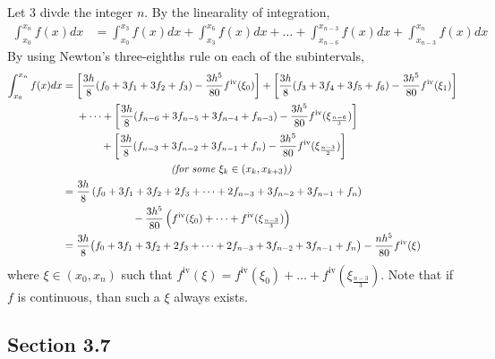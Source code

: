 \documentclass[12pt]{article}
\begin{document}
\noindent Let $3$ divde the integer $n$.  By the linearality of integration,
\begin{align*}
	\int_{x_0}^{x_n} f(x) dx &= \int_{x_0}^{x_3} f(x) dx + \int_{x_3}^{x_6} f(x) dx + \dots + \int_{x_{n-6}}^{x_{n-3}} f(x) dx + \int_{x_{n-3}}^{x_n} f(x) dx
\end{align*}
By using Newton's three-eighths rule on each of the subintervals,
\begin{align*}
	\int_{x_0}^{x_n} f(x) dx &= \left[\frac{3h}{8} (f_0 + 3f_1 + 3f_2 + f_3) - \frac{3h^5}{80}f^{\text{iv}}(\xi_0)\right] + \left[\frac{3h}{8} (f_3 + 3f_4 + 3f_5 + f_6) - \frac{3h^5}{80}f^{\text{iv}}(\xi_1)\right] \\
	&\ \ \ \ + \dots + \left[\frac{3h}{8} (f_{n-6} + 3f_{n-5} + 3f_{n-4} + f_{n-3}) - \frac{3h^5}{80}f^{\text{iv}}(\xi_{\frac{n-6}{3}})\right] \\
	&\ \ \ \ \ \ \ \ \ \ \ + \left[\frac{3h}{8} (f_{n-3} + 3f_{n-2} + 3f_{n-1} + f_n) - \frac{3h^5}{80}f^{\text{iv}}(\xi_{\frac{n-3}{2}})\right] \\
	&\ \ \ \ \ \ \ \ \ \ \ \ \ \ \ \ \ \ \ \ \ \ \ \ \ \ \ \ \ \ \ \text{\it (for some $\xi_k \in (x_k, x_{k+3})$)} \\
	&= \frac{3h}{8}\left(f_0 + 3f_1 + 3f_2 + 2f_3 + \dots + 2f_{n-3} + 3f_{n-2} + 3f_{n-1} + f_n\right) \\
	&\ \ \ \ \ \ \ \ \ \ \ \ \ \ \ \ \ \ \ \ - \frac{3h^5}{80}\left(f^{\text{iv}}(\xi_0) + \dots + f^{\text{iv}}(\xi_{\frac{n-3}{3}})\right) \\
	&= \frac{3h}{8}\big(f_0 + 3f_1 + 3f_2 + 2f_3 + \dots + 2f_{n-3} + 3f_{n-2} + 3f_{n-1} + f_n\big) - \frac{nh^5}{80}f^{\text{iv}}(\xi)
\end{align*}
where $\xi \in (x_0, x_n)$ such that $f^{\text{iv}}(\xi) = f^{\text{iv}}(\xi_0) + \dots + f^{\text{iv}}(\xi_{\frac{n-3}{3}})$.  Note that if $f$ is continuous, than such a $\xi$ always exists.

















\subsection*{Section 3.7}
\end{document}
